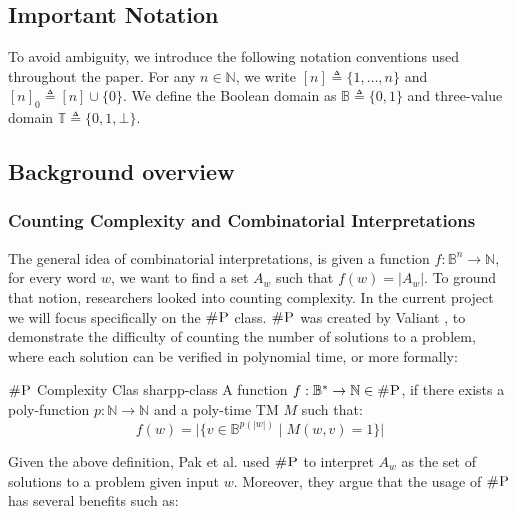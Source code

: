 
\subsection{Important Notation}

To avoid ambiguity, we introduce the following notation conventions used throughout the paper.
For any $n \in \mathbb{N}$, we write $[n] \triangleq \{1, \ldots, n\}$  and $[n]_0 \triangleq [n] \cup \{0\}$. 
We define the Boolean domain as $\mathbb{B} \triangleq \{0, 1\}$ and
three-value domain $\mathbb{T} \triangleq \{0, 1, \bot\}$.


\subsection{Background overview}


\subsubsection{Counting Complexity and Combinatorial Interpretations}

The general idea of combinatorial interpretations, is given a function $f: \mathbb{B}^n \to \mathbb{N}$, 
for every word $w$, we want to find a set $A_w$ such that $f(w)= |A_w|$.
To ground that notion, researchers looked into counting complexity.
In the current project we will focus specifically on the $\textsc{\#P}$ class.
$\textsc{\#P}$ was created by Valiant \cite{valiant_ComplexityComputingPermanent_1979},
to demonstrate the difficulty of counting the number of solutions to a problem,
where each solution can be verified in polynomial time, or more formally:

\begin{definitionbox}{$\textsc{\#P}$ Complexity Clas \cite{valiant_ComplexityComputingPermanent_1979}}{sharpp-class}
    A function $f: \mathbb{B}^* \to \mathbb{N} \in \textsc{\#P}$, if there exists a
    poly-function $p : \mathbb{N} \to \mathbb{N}$ and a poly-time TM $M$ such that:
    $$
    f(w) = \Big|\Big\{v \in \mathbb{B}^{p(|w|)} \mid M(w, v) =1 \Big\}\Big|
    $$
\end{definitionbox}

Given the above definition, Pak et al. \cite{pak_WhatCombinatorialInterpretation_2022, ikenmeyer_PositivitySymmetricGroup_2024}
used $\textsc{\#P}$ to interpret $A_w$ as the set of solutions to a problem given input $w$.
Moreover, they argue that the usage of $\textsc{\#P}$ has several benefits such as:

